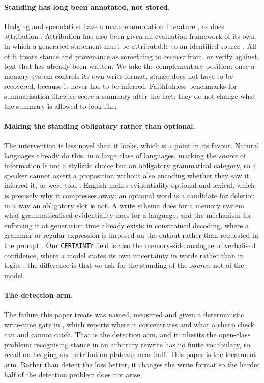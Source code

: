\documentclass[11pt]{article}
\begin{document}
\paragraph{Standing has long been annotated, not stored.} Hedging and speculation have a
mature annotation literature \citep{vincze2008bioscope,szarvas2012cross,farkas2010conll},
as does attribution \citep{pareti2016parc,newell2018polnear}. Attribution has also been
given an evaluation framework of its own, in which a generated statement must be
attributable to an identified source \citep{rashkin2023attribution}. All of it treats
stance and provenance as something to \emph{recover} from, or verify against, text that
has already been written. We take the complementary position: once a memory system
controls its own write format, stance does not have to be recovered, because it never has
to be inferred. Faithfulness benchmarks for summarisation
\citep{pagnoni2021frank,tang2023aggrefact} likewise score a summary after the fact; they
do not change what the summary is allowed to look like.

\paragraph{Making the standing obligatory rather than optional.} The intervention is less
novel than it looks, which is a point in its favour. Natural languages already do this:
in a large class of languages, marking the \emph{source} of information is not a stylistic
choice but an obligatory grammatical category, so a speaker cannot assert a proposition
without also encoding whether they saw it, inferred it, or were told
\citep{aikhenvald2004evidentiality}. English makes evidentiality optional and lexical,
which is precisely why it compresses away: an optional word is a candidate for deletion in
a way an obligatory slot is not. A write schema does for a memory system what
grammaticalised evidentiality does for a language, and the mechanism for enforcing it at
generation time already exists in constrained decoding, where a grammar or regular
expression is imposed on the output rather than requested in the prompt
\citep{willard2023guided}. Our \texttt{CERTAINTY} field is also the memory-side analogue
of verbalised confidence, where a model states its own uncertainty in words rather than
in logits \citep{lin2022teaching}; the difference is that we ask for the standing of the
\emph{source}, not of the model.

\paragraph{The detection arm.} The failure this paper treats was named, measured and
given a deterministic write-time gate in \citet{kwon2026factwash}, which reports where it
concentrates and what a cheap check can and cannot catch. That is the detection arm, and
it inherits the open-class problem: recognising stance in an arbitrary rewrite has no
finite vocabulary, so recall on hedging and attribution plateaus near half. This paper is
the treatment arm. Rather than detect the loss better, it changes the write format so the
harder half of the detection problem does not arise.
\end{document}

